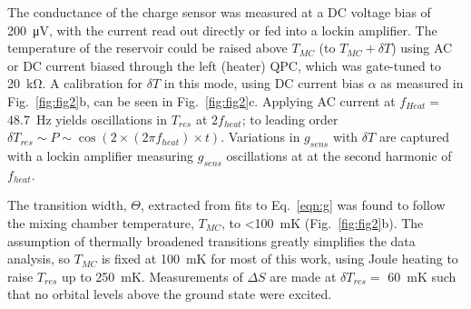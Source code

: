 \documentclass[twocolumn,showpacs,amsmath,amssymb,prl,aps,superscriptaddress]{revtex4-1}
\begin{document}
The conductance of the charge sensor was measured at a DC voltage bias of \SI{200}{\micro\volt}, with the current read out directly or fed into a lockin amplifier.  The temperature of the reservoir could be raised above $T_{MC}$ (to $T_{MC} + \delta T$) using AC or DC current biased through the left (heater) QPC, which was gate-tuned to \SI{20}{\kilo\ohm}. A calibration for $\delta T$ in this mode, using DC current bias $\alpha$ as measured in Fig.~\ref{fig:fig2}b, can be seen in Fig.~\ref{fig:fig2}c. Applying AC current at $f_{Heat} =$ \SI{48.7}{\hertz} yields oscillations in $T_{res}$ at $2f_{heat}$; to leading order $\delta T_{res} \sim P \sim \cos(2 \times (2 \pi f_{heat}) \times t)$. Variations in $g_{sens}$ with $\delta T$ are captured with a lockin amplifier measuring $g_{sens}$ oscillations at at the second harmonic of $f_{heat}$.

The transition width, $\Theta$, extracted from fits to Eq.~\ref{eqn:g} was found to follow the mixing chamber temperature, $T_{MC}$, to \SI{<100}{\milli\kelvin} (Fig.~\ref{fig:fig2}b). The assumption of thermally broadened transitions greatly simplifies the data analysis, so $T_{MC}$ is fixed at \SI{100}{\milli\kelvin} for most of this work, using Joule heating to raise $T_{res}$ up to \SI{250}{\milli\kelvin}. Measurements of $\Delta S$ are made at $\delta T_{res} = $ \SI{60}{\milli\kelvin} such that no orbital levels above the ground state were excited.


{}

\end{document}
